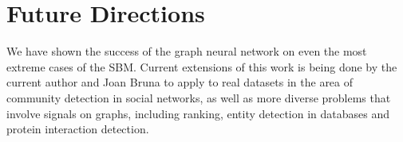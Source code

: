 \section{Future Directions}

We have shown the success of the graph neural network on even the most extreme cases of the SBM.  Current extensions of this work is being done by the current author and Joan Bruna to apply to real datasets in the area of community detection in social networks, as well as more diverse problems that involve signals on graphs, including ranking, entity detection in databases and protein interaction detection. 
